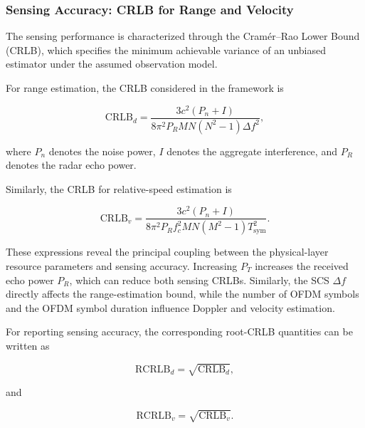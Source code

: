 \subsubsection{Sensing Accuracy: CRLB for Range and Velocity}

The sensing performance is characterized through the
Cram\'er--Rao Lower Bound (CRLB), which specifies the minimum achievable
variance of an unbiased estimator under the assumed observation model.

For range estimation, the CRLB considered in the framework is

\begin{equation}
\mathrm{CRLB}_{d}
=
\frac{
3c^2(P_n+I)
}{
8\pi^2
P_R
MN
\left(N^2-1\right)
\Delta f^2
},
\label{eq:isac_crlb_range}
\end{equation}

where $P_n$ denotes the noise power, $I$ denotes the aggregate interference,
and $P_R$ denotes the radar echo power.

Similarly, the CRLB for relative-speed estimation is

\begin{equation}
\mathrm{CRLB}_{v}
=
\frac{
3c^2(P_n+I)
}{
8\pi^2
P_R
f_c^2
MN
\left(M^2-1\right)
T_{\mathrm{sym}}^2
}.
\label{eq:isac_crlb_velocity}
\end{equation}

These expressions reveal the principal coupling between the physical-layer
resource parameters and sensing accuracy. Increasing $P_T$ increases the
received echo power $P_R$, which can reduce both sensing CRLBs. Similarly,
the SCS $\Delta f$ directly affects the range-estimation bound, while the
number of OFDM symbols and the OFDM symbol duration influence Doppler and
velocity estimation.

For reporting sensing accuracy, the corresponding root-CRLB quantities can
be written as

\begin{equation}
\mathrm{RCRLB}_{d}
=
\sqrt{\mathrm{CRLB}_{d}},
\label{eq:isac_root_crlb_range}
\end{equation}

and

\begin{equation}
\mathrm{RCRLB}_{v}
=
\sqrt{\mathrm{CRLB}_{v}}.
\label{eq:isac_root_crlb_velocity}
\end{equation}

